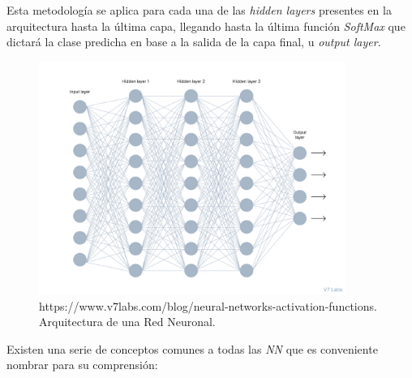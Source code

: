             Esta metodología se aplica para cada una de las \textit{hidden layers} presentes en la arquitectura hasta la última capa, llegando hasta la última función \textit{SoftMax} que dictará la clase predicha en base a la salida de la capa final, u \textit{output layer}.\\

            \begin{figure}[h]
                \centering
                \includegraphics[width=10cm]{archivos/3.Tecnologias/RedesNeuronales/NNImage}
                \caption{https://www.v7labs.com/blog/neural-networks-activation-functions. Arquitectura de una Red Neuronal.}
                \label{NNImage}
             \end{figure}



            Existen una serie de conceptos comunes a todas las \textit{NN} que es conveniente nombrar para su comprensión:


